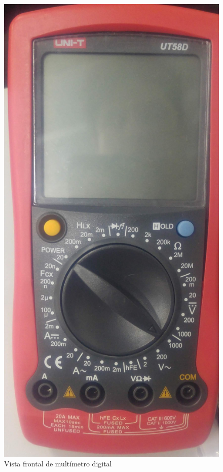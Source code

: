\begin{figure}[htbp]
  \centering
  \includegraphics[width=\textwidth,height=\textheight,keepaspectratio]{images/fotos/tester3.jpg}
  \caption{Vista frontal de multímetro digital}
  \label{fig:multimetro_frente}
\end{figure}
